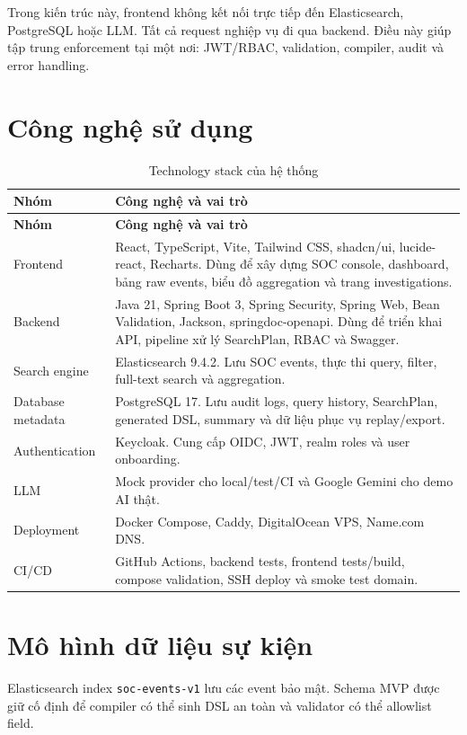 \documentclass[12pt,a4paper]{report}
\begin{document}
Trong kiến trúc này, frontend không kết nối trực tiếp đến Elasticsearch, PostgreSQL hoặc LLM. Tất cả request nghiệp vụ đi qua backend. Điều này giúp tập trung enforcement tại một nơi: JWT/RBAC, validation, compiler, audit và error handling.

\section{Công nghệ sử dụng}

\begin{longtable}{p{4cm}p{10cm}}
\caption{Technology stack của hệ thống}\\
\toprule
\textbf{Nhóm} & \textbf{Công nghệ và vai trò} \\
\midrule
\endfirsthead
\toprule
\textbf{Nhóm} & \textbf{Công nghệ và vai trò} \\
\midrule
\endhead
Frontend & React, TypeScript, Vite, Tailwind CSS, shadcn/ui, lucide-react, Recharts. Dùng để xây dựng SOC console, dashboard, bảng raw events, biểu đồ aggregation và trang investigations. \\
Backend & Java 21, Spring Boot 3, Spring Security, Spring Web, Bean Validation, Jackson, springdoc-openapi. Dùng để triển khai API, pipeline xử lý SearchPlan, RBAC và Swagger. \\
Search engine & Elasticsearch 9.4.2. Lưu SOC events, thực thi query, filter, full-text search và aggregation. \\
Database metadata & PostgreSQL 17. Lưu audit logs, query history, SearchPlan, generated DSL, summary và dữ liệu phục vụ replay/export. \\
Authentication & Keycloak. Cung cấp OIDC, JWT, realm roles và user onboarding. \\
LLM & Mock provider cho local/test/CI và Google Gemini cho demo AI thật. \\
Deployment & Docker Compose, Caddy, DigitalOcean VPS, Name.com DNS. \\
CI/CD & GitHub Actions, backend tests, frontend tests/build, compose validation, SSH deploy và smoke test domain. \\
\bottomrule
\end{longtable}

\section{Mô hình dữ liệu sự kiện}

Elasticsearch index \texttt{soc-events-v1} lưu các event bảo mật. Schema MVP được giữ cố định để compiler có thể sinh DSL an toàn và validator có thể allowlist field.
\end{document}
